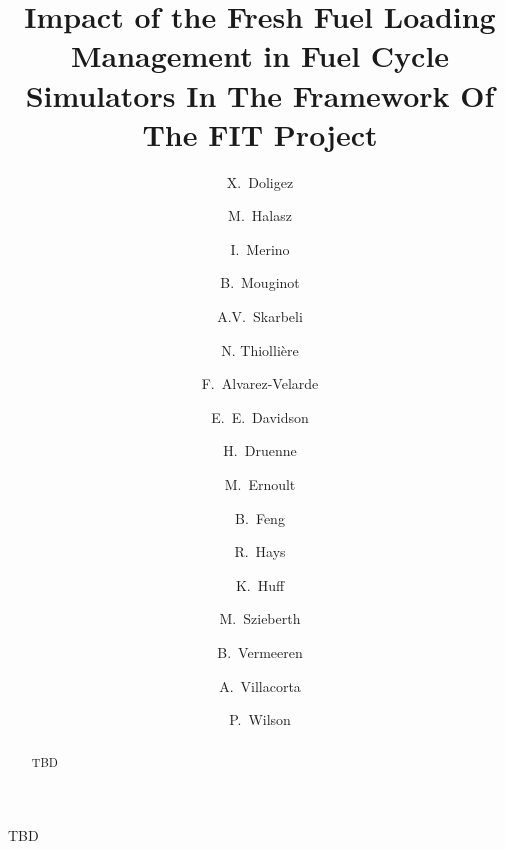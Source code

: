 \documentclass[review]{elsarticle}
\begin{document}
\begin{frontmatter}

\title{Impact of the Fresh Fuel Loading Management in Fuel Cycle Simulators In The Framework Of The FIT Project}



\author[IPNO]{X.~Doligez}
\author[BUD]{M.~Halasz}
\author[MAULE]{I.~Merino}
\author[MAD]{B.~Mouginot}
\author[CIEMAT]{A.V.~Skarbeli}

\author[SUB]{N. Thiolli\`ere }

\author[CIEMAT]{F.~Alvarez-Velarde}
\author[ORNL]{E.~E.~Davidson}
\author[TRACT]{H.~Druenne}
\author[IPNO]{M.~Ernoult}
\author[ANL]{B.~Feng}
\author[INL]{R.~Hays}
\author[UI]{K.~Huff}
\author[BUD]{M.~Szieberth}
\author[TRACT]{B.~Vermeeren}
\author[CIEMAT]{A.~Villacorta}
\author[MAD]{P.~Wilson}


\address[IPNO]{Institut de Physique Nucléaire d’Orsay, CNRS-IN2P3/Univ, Paris-Sud, France}
\address[BUD]{Budapest University of Technology and Economics (BME), Institute of Nuclear Techniques, 1111 Budapest, Müegyetem rkp. 3-9, Hungary}
\address[MAULE]{Catholic University of the Maule, Av. San Miguel 3605, Talca, Chile}
\address[MAD]{Univ. of Wisconsin Madison, Department of Nuclear Engineering and Engineering Physics, Madison, WI, United States}
\address[CIEMAT]{CIEMAT, Avda. Complutense, 40, 28040 Madrid, Spain}
\address[SUB]{Subatech, IMTA-IN2P3/CNRS-Universit\'e, Nantes, F-44307, France}

\address[ORNL]{Oak Ridge National Laboratory, Building 5700, Mail Stop 6172, Oak Ridge, TN 37831, United States}
\address[TRACT]{Tractebel Engie, Boulevard Simón Bolívar 34-36, 1000 Brussels, Belgium}
\address[ANL]{Argonne National Laboratory, 9700 Cass Ave., Lemont, IL 60439, USA}
\address[INL]{Idaho National Laboratory, 2525 Fremont Ave., Idaho Falls, ID 83402, USA}
\address[UI]{University of Illinois, 104 S. Wright St., Urbana, IL 61801, USA}


\begin{abstract}

TBD

\end{abstract}

\begin{keyword}

TBD 

\end{keyword}

\end{frontmatter}
\end{document}
